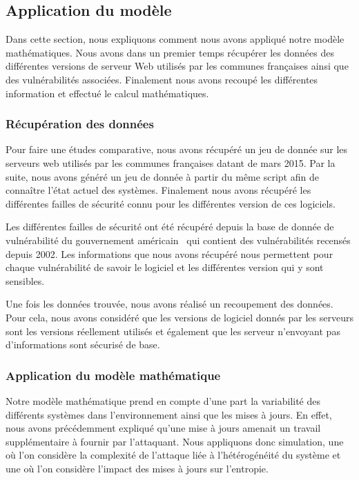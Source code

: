 \subsection{Application du modèle}\label{sec:simulation}
Dans cette section, nous expliquons comment nous avons appliqué notre modèle mathématiques.
Nous avons dans un premier temps récupérer les données des différentes versions de serveur Web utilisés par les communes françaises ainsi que des vulnérabilités associées.
Finalement nous avons recoupé les différentes information et effectué le calcul mathématiques.

\subsubsection{Récupération des données}\label{sec:recupData}
Pour faire une études comparative, nous avons récupéré un jeu de donnée sur les serveurs web utilisés par les communes françaises datant de mars 2015.
Par la suite, nous avons généré un jeu de donnée à partir du même script afin de connaître l'état actuel des systèmes.
Finalement nous avons récupéré les différentes failles de sécurité connu pour les différentes version de ces logiciels.

Les différentes failles de sécurité ont été récupéré depuis la base de donnée de vulnérabilité du gouvernement américain~\cite{vulnDatabase} qui contient des vulnérabilités recensés depuis 2002.
Les informations que nous avons récupéré nous permettent pour chaque vulnérabilité de savoir le logiciel et les différentes version qui y sont sensibles.


Une fois les données trouvée, nous avons réalisé un recoupement des données.
Pour cela, nous avons considéré que les versions de logiciel donnés par les serveurs sont les versions réellement utilisés et également que les serveur n'envoyant pas d'informations sont sécurisé de base.


\subsubsection{Application du modèle mathématique}
Notre modèle mathématique prend en compte d'une part la variabilité des différents systèmes dans l'environnement ainsi que les mises à jours.
En effet, nous avons précédemment expliqué qu'une mise à jours amenait un travail supplémentaire à fournir par l'attaquant.
Nous appliquons donc simulation, une où l'on considère la complexité de l'attaque liée à l'hétérogénéité du système et une où l'on considère l'impact des mises à jours sur l'entropie.

